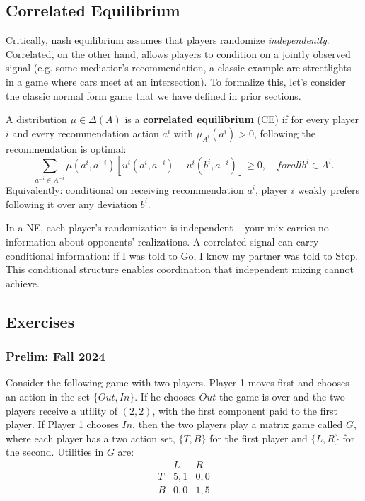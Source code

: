 \documentclass[11pt,english]{article}
\begin{document}
\subsection{Correlated Equilibrium}
Critically, nash equilibrium assumes that players randomize \textit{independently}. Correlated, on the other hand, allows players to condition on a jointly observed signal (e.g. some mediatior's recommendation, a classic example are streetlights in a game where cars meet at an intersection). To formalize this, let's consider the classic normal form game that we have defined in prior sections.

\begin{definition}
A distribution $\mu\in \Delta(A)$ is a \textbf{correlated equilibrium} (CE) if for every player $i$ and every recommendation action $a^i$ with $\mu_{A^i}(a^i) > 0$, following the recommendation is optimal: $$\sum_{a^{-i}\in A^{-i}}\mu(a^i, a^{-i})\left[u^i(a^i, a^{-i}) - u^i(b^i,a^{-i})\right] \geq 0,\quad forall b^i \in A^i.$$
Equivalently: conditional on receiving recommendation $a^i$, player $i$ weakly prefers following it over any deviation $b^i$.
\end{definition}
In a NE, each player’s randomization is independent – your mix carries no information about opponents’ realizations. A correlated signal can carry conditional information: if I was told to Go, I know my partner was told to Stop. This conditional structure enables coordination that independent mixing cannot achieve.

\subsection{Exercises}

\subsubsection{Prelim: Fall 2024}\label{Rustichini Prelim: Fall 2024}
Consider the following game with two players. Player 1 moves first and chooses
an action in the set $\{Out, In\}$. If he chooses $Out$ the game is over and
the two players receive a utility of $(2,2)$, with the first component paid to
the first player. If Player 1 chooses $In$, then the two players play a matrix
game called $G$, where each player has a two action set, $\{T, B\}$ for the
first player and $\{L, R\}$ for the second. Utilities in $G$ are:
\[
\begin{array}{r|cc}
       & L   & R   \\
\hline
T & 5,1 & 0,0 \\
B & 0,0 & 1,5 \\
\end{array}
\]
 
\end{document}
